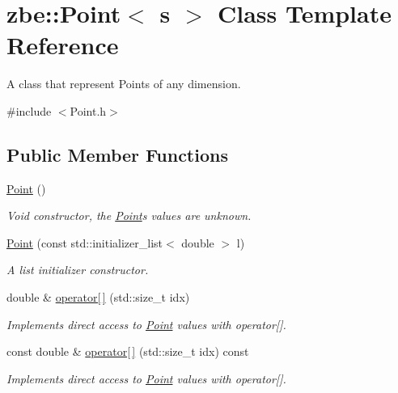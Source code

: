 \hypertarget{classzbe_1_1_point}{}\section{zbe\+:\+:Point$<$ s $>$ Class Template Reference}
\label{classzbe_1_1_point}


A class that represent Points of any dimension.  




{\ttfamily \#include $<$Point.\+h$>$}

\subsection*{Public Member Functions}
\begin{DoxyCompactItemize}
\item 
\hyperlink{classzbe_1_1_point_a2f4b573c8afece71382e36e8a972c768}{Point} ()
\begin{DoxyCompactList}\small\item\em Void constructor, the \hyperlink{classzbe_1_1_point}{Point}\textquotesingle{}s values are unknown. \end{DoxyCompactList}\item 
\hyperlink{classzbe_1_1_point_aebca7e4128f8cc20a0d2862126619aab}{Point} (const std\+::initializer\+\_\+list$<$ double $>$ l)
\begin{DoxyCompactList}\small\item\em A list initializer constructor. \end{DoxyCompactList}\item 
double \& \hyperlink{classzbe_1_1_point_a3f60b81f07951c6e1a012cfdd903c27a}{operator\mbox{[}$\,$\mbox{]}} (std\+::size\+\_\+t idx)
\begin{DoxyCompactList}\small\item\em Implements direct access to \hyperlink{classzbe_1_1_point}{Point} values with operator\mbox{[}\mbox{]}. \end{DoxyCompactList}\item 
const double \& \hyperlink{classzbe_1_1_point_a4a928fbbd33b681f7e7a1a0ab7f3ac92}{operator\mbox{[}$\,$\mbox{]}} (std\+::size\+\_\+t idx) const 
\begin{DoxyCompactList}\small\item\em Implements direct access to \hyperlink{classzbe_1_1_point}{Point} values with operator\mbox{[}\mbox{]}. \end{DoxyCompactList}\item 

\end{DoxyCompactItemize}
